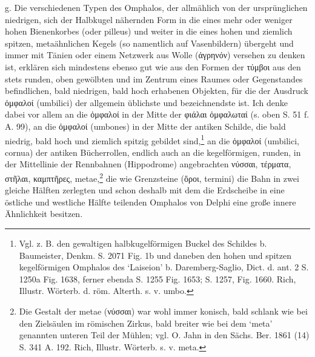 \documentclass[a4paper, 11pt, oneside]{article}
\begin{document}
g. Die verschiedenen Typen des Omphalos, der allmählich von der ursprünglichen niedrigen, sich der Halbkugel nähernden Form in die eines mehr oder weniger hohen Bienenkorbes (oder pilleus) und weiter in die eines hohen und ziemlich spitzen, metaähnlichen Kegels (so namentlich auf Vasenbildern) übergeht und immer mit Tänien oder einem Netzwerk aus Wolle (ἀγρηνόν) versehen zu denken ist, erklären sich mindestens ebenso gut wie aus den Formen der τύμβοι aus den stets runden, oben gewölbten und im Zentrum eines Raumes oder Gegenstandes befindlichen, bald niedrigen, bald hoch erhabenen Objekten, für die der Ausdruck ὀμφαλοί (umbilici) der allgemein üblichste und bezeichnendste ist. Ich denke dabei vor allem an die ὀμφαλοί in der Mitte der φιάλαι ὀμφαλωταί (s. oben S. 51 f. A. 99), an die ὀμφαλοί (umbones) in der Mitte der antiken Schilde, die bald niedrig, bald hoch und ziemlich spitzig gebildet sind,\footnote{Vgl. z. B. den gewaltigen halbkugelförmigen Buckel des Schildes b. Baumeister, Denkm. S. 2071 Fig. 1b und daneben den hohen und spitzen kegelförmigen Omphalos des `Laiseion' b. Daremberg-Saglio, Dict. d. ant. 2 S. 1250a Fig. 1638, ferner ebenda S. 1255 Fig. 1653; S. 1257, Fig. 1660. Rich, Illustr. Wörterb. d. röm. Alterth. s. v. umbo.} an die ὀμφαλοί (umbilici, cornua) der antiken Bücherrollen, endlich auch an die kegelförmigen, runden, in der Mittellinie der Rennbahnen (Hippodrome) angebrachten νύσσαι, τέρματα, στῆλαι, καμπτῆρες, metae,\footnote{Die Gestalt der metae (νύσσαι) war wohl immer konisch, bald schlank wie bei den Zielsäulen im römischen Zirkus, bald breiter wie bei dem `meta' genannten unteren Teil der Mühlen; vgl. O. Jahn in den Sächs. Ber. 1861 (14) S. 341 A. 192. Rich, Illustr. Wörterb. s. v. meta.} die wie Grenzsteine (ὅροι, termini) die Bahn in zwei gleiche Hälften zerlegten und schon deshalb mit dem die Erdscheibe in eine östliche und westliche Hälfte teilenden Omphalos von Delphi eine große innere Ähnlichkeit besitzen.
\end{document}
